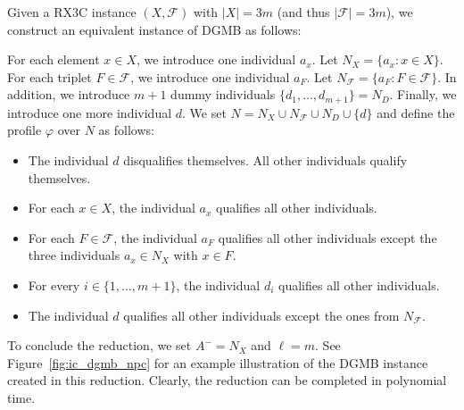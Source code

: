 \documentclass[
    12pt,               %
    a4paper,            %
    bibtotoc,           %
    pointlessnumbers,   %
    ngerman,            %
    titlepage,          %
    leqno,              %
    ]{scrarticle}       %
\newcommand\figref{Figure~\ref}
\begin{document}
\begin{Proof}
Given a RX3C instance $(X, \mathcal{F})$ with $|X|=3m$ (and thus $|\mathcal{F}|=3m$), we construct an equivalent instance of DGMB as follows:

For each element $x \in X$, we introduce one individual $a_x$. Let $N_X = \{ a_x : x \in X \}$. For each triplet $F \in \mathcal{F}$, we introduce one individual $a_F$. Let $N_\mathcal{F} = \{ a_F : F \in \mathcal{F} \}$. In addition, we introduce $m+1$ dummy individuals $\{ d_1, \ldots, d_{m+1} \} = N_D$. Finally, we introduce one more individual $d$. We set $N = N_X \cup N_\mathcal{F} \cup N_D \cup \{d\}$ and define the profile $\varphi$ over $N$ as follows:

\begin{itemize}[nolistsep]
\item
The individual $d$ disqualifies themselves. All other individuals qualify themselves.
\item
For each $x \in X$, the individual $a_x$ qualifies all other individuals.
\item
For each $F \in \mathcal{F}$, the individual $a_F$ qualifies all other individuals except the three individuals $a_x \in N_X$ with $x \in F$.
\item
For every $i \in \{ 1, \ldots, m+1 \}$, the individual $d_i$ qualifies all other individuals.
\item
The individual $d$ qualifies all other individuals except the ones from $N_\mathcal{F}$.
\end{itemize}

To conclude the reduction, we set $A^- = N_X$ and $\ell = m$. See \figref{fig:ic_dgmb_npc} for an example illustration of the DGMB instance created in this reduction. Clearly, the reduction can be completed in polynomial time.



\begin{figure}[!tbh]
\centering
{}
\end{figure}
\end{Proof}
\end{document}
